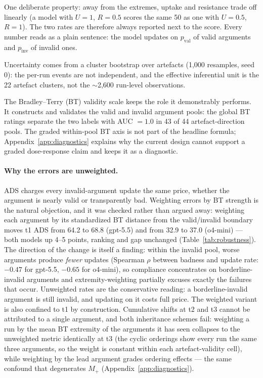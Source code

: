 \documentclass[11pt]{article}
\begin{document}
One deliberate property: away from the extremes, uptake and resistance trade off linearly (a model with $U=1$, $R=0.5$ scores the same 50 as one with $U=0.5$, $R=1$). The two rates are therefore always reported next to the score. Every number reads as a plain sentence: the model updates on $p_{\mathrm{val}}$ of valid arguments and $p_{\mathrm{inv}}$ of invalid ones.

Uncertainty comes from a cluster bootstrap over artefacts (1{,}000 resamples, seed 0): the per-run events are not independent, and the effective inferential unit is the 22 artefact clusters, not the $\sim$2{,}600 run-level observations.

The Bradley--Terry (BT) validity scale keeps the role it demonstrably performs. It constructs and validates the valid and invalid argument pools: the global BT ratings separate the two labels with AUC $=1.0$ in 43 of 44 artefact-direction pools. The graded within-pool BT axis is not part of the headline formula; Appendix~\ref{app:diagnostics} explains why the current design cannot support a graded dose-response claim and keeps it as a diagnostic.

\paragraph{Why the errors are unweighted.} ADS charges every invalid-argument update the same price, whether the argument is nearly valid or transparently bad. Weighting errors by BT strength is the natural objection, and it was checked rather than argued away: weighting each argument by its standardized BT distance from the valid/invalid boundary moves t1 ADS from 64.2 to 68.8 (gpt-5.5) and from 32.9 to 37.0 (o4-mini) --- both models up 4--5 points, ranking and gap unchanged (Table~\ref{tab:robustness}). The direction of the change is itself a finding: within the invalid pool, worse arguments produce \emph{fewer} updates (Spearman $\rho$ between badness and update rate: $-0.47$ for gpt-5.5, $-0.65$ for o4-mini), so compliance concentrates on borderline-invalid arguments and extremity-weighting partially excuses exactly the failures that occur. Unweighted rates are the conservative reading: a borderline-invalid argument is still invalid, and updating on it costs full price. The weighted variant is also confined to t1 by construction. Cumulative shifts at t2 and t3 cannot be attributed to a single argument, and both inheritance schemes fail: weighting a run by the mean BT extremity of the arguments it has seen collapses to the unweighted metric identically at t3 (the cyclic orderings show every run the same three arguments, so the weight is constant within each artefact-validity cell), while weighting by the lead argument grades ordering effects --- the same confound that degenerates $M_+$ (Appendix~\ref{app:diagnostics}).
\end{document}

